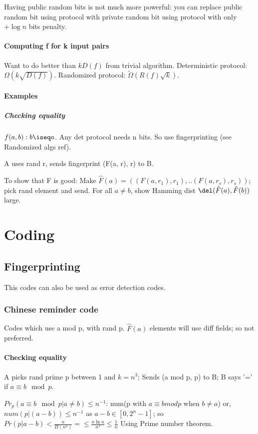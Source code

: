 \documentclass[oneside, article]{memoir}
\begin{document}
Having public random bits is not much more powerful: you can replace public random bit using protocol with private random bit using protocol with only $+ \log n$ bits penalty.

\subsection{Computing f for k input pairs}
Want to do better than $k D(f)$ from trivial algorithm. Deterministic protocol: $\Omega(k \sqrt{D(f)})$. Randomized protocol: $\tilde{\Omega}(R(f)\sqrt{k})$.

\subsection{Examples}
\subsubsection{Checking equality}
$f(a, b): b \iseq a$. Any det protocol needs n bits. So use fingerprinting (see Randomized algs ref).

A uses rand r, sends fingerprint (F(a, r), r) to B.

To show that F is good: Make $\hat{F}(a) = ((F(a, r_{1}), r_{1}), .. (F(a, r_{s}), r_{s}))$; pick rand element and send. For all $a \neq b$, show Hamming dist $\del(\hat{F}(a), \hat{F}(b))$ large.

\part{Coding}
\chapter{Fingerprinting}
This codes can also be used as error detection codes.

\section{Chinese reminder code}
Codes which use a mod p, with rand p. $\hat{F}(a)$ elements will use diff fields; so not preferred.

\subsection{Checking equality}
A picks rand prime p between 1 and $k = n^{3}$; Sends (a mod p, p) to B; B says '=' if $a \equiv b \mod p$.

$Pr_{p}(a \equiv b \mod p|a \neq b) \leq n^{-1}$: num(p with $a \equiv b mod p$ when $b \neq a$) or, $num(p | (a-b)) \leq n^{-1}$ as $a-b \in [0, 2^{n}-1]$; so $Pr(p|a-b) < \frac{n}{\Pi(n^{3})} = \leq \frac{n\ln n}{n^{3}} \leq \frac{1}{n}$ Using Prime number theorem.
\end{document}
